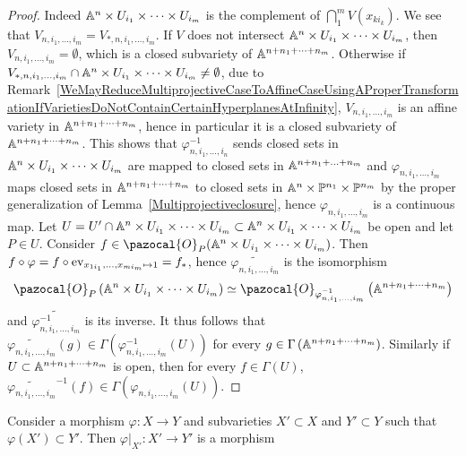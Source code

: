     \begin{proof}
        Indeed $\mathbb{A}^n\times U_{i_1}\times \cdots\times U_{i_m}$ is the complement of $\bigcap_1^m V(x_{ki_k})$. We see that $V_{n,i_1,\dots,i_m} = V_{\ast,n, i_1,\dots,i_m}$. If $V$ does not intersect $\mathbb{A}^n\times U_{i_1}\times\cdots \times U_{i_m}$, then $V_{n,i_1,\dots,i_m} = \emptyset$, which is a closed subvariety of $\A^{n+n_1+\dots+n_m}$. Otherwise if $V_{\ast,n,i_1,\dots,i_m}\cap \mathbb{A}^n\times U_{i_1}\times \cdots \times U_{i_m}\neq \emptyset$, due to Remark~\ref{WeMayReduceMultiprojectiveCaseToAffineCaseUsingAProperTransformationIfVarietiesDoNotContainCertainHyperplanesAtInfinity}, $V_{n,i_1,\dots,i_m}$ is an affine variety in $\A^{n+n_1+\dots+n_m}$, hence in particular it is a closed subvariety of $\A^{n+n_1+\dots+n_m}$. This shows that $\varphi_{n,i_1,\dots,i_n}^{-1}$ sends closed sets in $\mathbb{A}^n\times U_{i_1}\times \cdots \times U_{i_m}$ are mapped to closed sets in $\A^{n+n_1+\dots +n_m}$ and $\varphi_{n,i_1,\dots,i_m}$ maps closed sets in $\A^{n+n_1+\dots+n_m}$ to closed sets in $\mathbb{A}^n\times \mathbb{P}^{n_1}\times \mathbb{P}^{n_m}$ by the proper generalization of Lemma~\ref{Multiprojectiveclosure}, hence $\varphi_{n,i_1,\dots,i_m}$ is a continuous map. Let $U=U'\cap \mathbb{A}^n\times U_{i_1}\times \cdots \times U_{i_m}\subset \mathbb{A}^n\times U_{i_1}\times \cdots \times U_{i_m}$ be open and let $P\in U$. Consider $f\in \pazocal{O}_P(\A^n\times U_{i_1}\times \cdots \times U_{i_m})$. Then $f\circ \varphi = f\circ \mathrm{ev}_{x_{1i_1},\dots,x_{mi_m}\mapsto 1}=f_\ast$, hence $\widetilde{\varphi_{n,i_1,\dots,i_m}}$ is the isomorphism 
        $$\pazocal{O}_P\left(\A^n\times U_{i_1}\times \cdots \times U_{i_m}\right)\simeq \pazocal{O}_{\varphi_{n,i_1,\dots,i_m}^{-1}}\left(\A^{n+n_1+\dots+n_m}\right)$$ and $\widetilde{\varphi_{n,i_1,\dots,i_m}^{-1}}$ is its inverse. It thus follows that $\widetilde{\varphi_{n,i_1,\dots,i_m}}(g)\in \Gamma\left(\varphi_{n,i_1,\dots,i_m}^{-1}(U)\right)$ for every $g\in \Gamma\left(\A^{n+n_1+\dots +n_m}\right)$. Similarly if $U\subset \mathbb{A}^{n+n_1+\dots+n_m}$ is open, then for every $f\in \Gamma(U)$, $\widetilde{\varphi_{n,i_1,\dots,i_m}}^{-1}(f)\in \Gamma(\varphi_{n,i_1,\dots,i_m}(U))$. 
    \end{proof}
    \begin{lemma}\label{RestrictionOfAMorphismToVarietiesIsAMorphism}
        Consider a morphism $\varphi: X\rightarrow Y$ and subvarieties $X'\subset X$ and $Y'\subset Y$ such that $\varphi(X')\subset Y'$. Then $\left. \varphi\right|_{X'} : X'\rightarrow Y'$ is a morphism
    \end{lemma}
